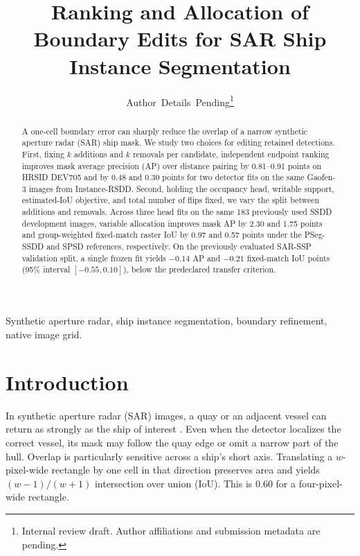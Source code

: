 \documentclass[journal]{IEEEtran}
\begin{document}
\raggedbottom
\title{Ranking and Allocation of Boundary Edits for SAR Ship Instance Segmentation}
\author{Author~Details~Pending\thanks{Internal review draft. Author affiliations and submission metadata are pending.}}
\maketitle

\begin{abstract}
A one-cell boundary error can sharply reduce the overlap of a narrow synthetic aperture radar (SAR) ship mask. We study two choices for editing retained detections. First, fixing \(k\) additions and \(k\) removals per candidate, independent endpoint ranking improves mask average precision (AP) over distance pairing by 0.81--0.91 points on HRSID DEV705 and by 0.48 and 0.30 points for two detector fits on the same Gaofen-3 images from Instance-RSDD. Second, holding the occupancy head, writable support, estimated-IoU objective, and total number of flips fixed, we vary the split between additions and removals. Across three head fits on the same 183 previously used SSDD development images, variable allocation improves mask AP by 2.30 and 1.75 points and group-weighted fixed-match raster IoU by 0.97 and 0.57 points under the PSeg-SSDD and SPSD references, respectively. On the previously evaluated SAR-SSP validation split, a single frozen fit yields \(-0.14\) AP and \(-0.21\) fixed-match IoU points (95\% interval \([-0.55,0.10]\)), below the predeclared transfer criterion.
\end{abstract}
\begin{IEEEkeywords}
Synthetic aperture radar, ship instance segmentation, boundary refinement, native image grid.
\end{IEEEkeywords}

\section{Introduction}
\label{sec:introduction}

In synthetic aperture radar (SAR) images, a quay or an adjacent vessel can return as strongly as the ship of interest \cite{hrsid,rsdd,gao2024}. Even when the detector localizes the correct vessel, its mask may follow the quay edge or omit a narrow part of the hull. Overlap is particularly sensitive across a ship's short axis. Translating a \(w\)-pixel-wide rectangle by one cell in that direction preserves area and yields \((w-1)/(w+1)\) intersection over union (IoU). This is 0.60 for a four-pixel-wide rectangle.
\end{document}
